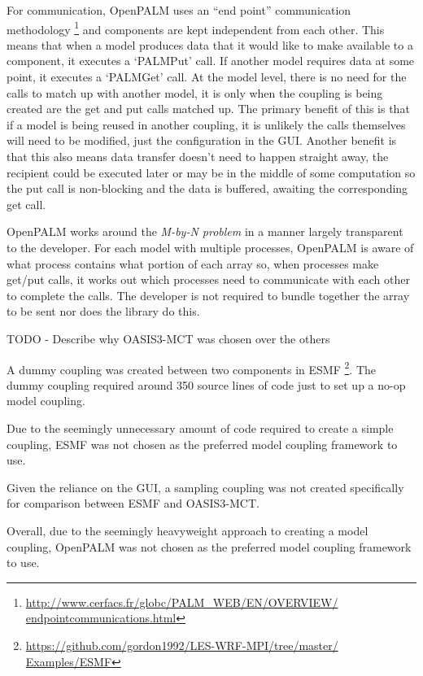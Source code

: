 \documentclass{acm_proc_article-sp}
\renewcommand{\_}{\underscore\hspace{0pt}}
\begin{document}
For communication, OpenPALM uses an ``end point'' communication methodology
\footnote{\url{http://www.cerfacs.fr/globc/PALM_WEB/EN/OVERVIEW/
endpointcommunications.html}} and components are kept independent from each
other. This means that when a model produces data that it would like to make
available to a component, it executes a `PALM\_Put' call. If another model
requires data at some point, it executes a `PALM\_Get' call. At the model level,
there is no need for the calls to match up with another model, it is only when
the coupling is being created are the get and put calls matched up. The primary
benefit of this is that if a model is being reused in another coupling, it is
unlikely the calls themselves will need to be modified, just the configuration
in the GUI. Another benefit is that this also means data transfer doesn't need
to happen straight away, the recipient could be executed later or may be in the
middle of some computation so the put call is non-blocking and the data is
buffered, awaiting the corresponding get call.

OpenPALM works around the \textit{M-by-N problem} in a manner largely
transparent to the developer. For each model with multiple processes, OpenPALM
is aware of what process contains what portion of each array so, when processes
make get/put calls, it works out which processes need to communicate with each
other to complete the calls. The developer is not required to bundle together
the array to be sent nor does the library do this.

TODO - Describe why OASIS3-MCT was chosen over the others


A dummy coupling was created between two components in ESMF
\footnote{\url{https://github.com/gordon1992/LES-WRF-MPI/tree/master/
Examples/ESMF}}.
The dummy coupling required around 350 source lines of code just to set up a
no-op model coupling.

Due to the seemingly unnecessary amount of code required to create a simple
coupling, ESMF was not chosen as the preferred model coupling framework to use.


Given the reliance on the GUI, a sampling coupling was not created specifically
for comparison between ESMF and OASIS3-MCT.

Overall, due to the seemingly heavyweight approach to creating a model coupling,
OpenPALM was not chosen as the preferred model coupling framework to use.
\end{document}
